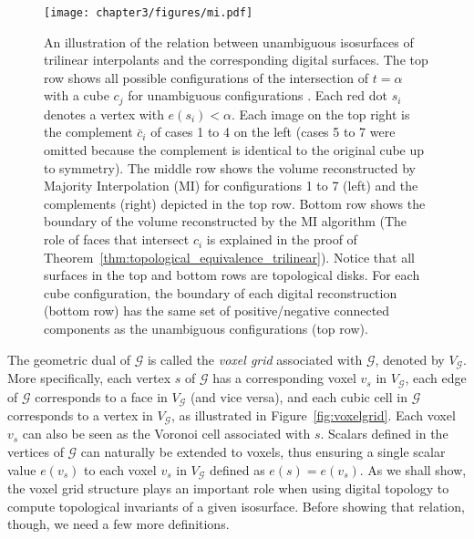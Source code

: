 \begin{figure}[b]
\begin{center}
\texttt{[image: chapter3/figures/mi.pdf]}
\caption{An illustration of the relation between unambiguous
  isosurfaces of trilinear interpolants and the corresponding digital
  surfaces.  The top row shows all possible configurations of the
  intersection of $t = \alpha$ with a cube $c_j$ for unambiguous
  configurations \cite{lopes:tvcg:2003}.  Each red dot $s_i$ denotes a
  vertex with $e(s_i) < \alpha$. Each image on the top right is the
  complement $\bar{c}_i$ of cases 1 to 4 on the left (cases 5 to 7
  were omitted because the complement is identical to the original
  cube up to symmetry).  The middle row shows the volume reconstructed
  by Majority Interpolation (MI) for configurations 1 to 7 (left) and
  the complements (right) depicted in the top row.  Bottom row shows
  the boundary of the volume reconstructed by the MI algorithm (The
  role of faces that intersect $c_i$ is explained in the proof of
  Theorem~\ref{thm:topological_equivalence_trilinear}).  Notice that
  all surfaces in the top and bottom rows are topological disks. For
  each cube configuration, the boundary of each digital reconstruction
  (bottom row) has the same set of positive/negative connected components as the
  unambiguous configurations (top row).  }
\label{fig:topology_preserving}
\end{center}
\end{figure}

The geometric dual of $\mathcal{G}$ is called the \emph{voxel grid}
associated with $\mathcal{G}$, denoted by $V_{\mathcal{G}}$. More
specifically, each vertex $s$ of $\mathcal{G}$ has a corresponding
voxel $v_s$ in $V_{\mathcal{G}}$, each edge of $\mathcal{G}$
corresponds to a face in $V_{\mathcal{G}}$ (and vice versa), and each
cubic cell in $\mathcal{G}$ corresponds to a vertex in
$V_{\mathcal{G}}$, as illustrated in Figure~\ref{fig:voxelgrid}.  Each
voxel $v_s$ can also be seen as the Voronoi cell associated with $s$.
Scalars defined in the vertices of $\mathcal{G}$ can naturally be
extended to voxels, thus ensuring a single scalar value $e(v_s)$ to
each voxel $v_s$ in $V_{\mathcal{G}}$ defined as $e(s)=e(v_s)$.  As we
shall show, the voxel grid structure plays an
important role when using digital topology to compute topological
invariants of a given isosurface. Before showing that relation,
though, we need a few more definitions.

